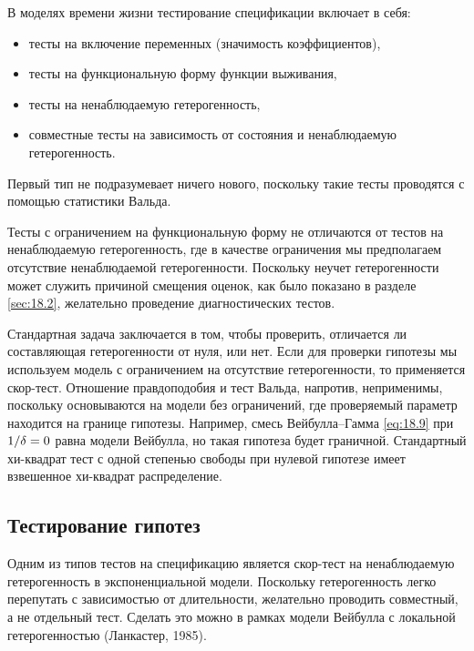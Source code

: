 \noindent
В моделях времени жизни тестирование спецификации включает в себя:
\begin{itemize}
\item тесты на включение переменных (значимость коэффициентов),\\
\item тесты на функциональную форму функции выживания,\\
\item тесты на ненаблюдаемую гетерогенность,\\
\item совместные тесты на зависимость от состояния %
и ненаблюдаемую гетерогенность.
\end{itemize}


Первый тип не подразумевает ничего нового, поскольку такие тесты проводятся с помощью статистики Вальда.

Тесты с ограничением на функциональную форму не отличаются от тестов на ненаблюдаемую гетерогенность, где в качестве ограничения мы предполагаем отсутствие ненаблюдаемой гетерогенности. Поскольку неучет гетерогенности может служить причиной смещения оценок, как было показано в разделе \ref{sec:18.2}, желательно проведение диагностических тестов.

Стандартная задача заключается в том, чтобы проверить, отличается ли составляющая гетерогенности от нуля, или нет. Если для проверки гипотезы мы используем модель с ограничением на отсутствие гетерогенности, то применяется скор-тест. Отношение правдоподобия и тест Вальда, напротив, неприменимы, поскольку основываются на модели без ограничений, где проверяемый параметр находится на границе гипотезы.
Например, смесь Вейбулла--Гамма \ref{eq:18.9} при $1/\delta = 0$ равна модели Вейбулла, но такая гипотеза будет граничной. %
Стандартный хи-квадрат тест с одной степенью свободы при нулевой гипотезе имеет взвешенное хи-квадрат распределение.


\subsection{Тестирование гипотез}\label{sec:18.7.1}

\noindent
Одним из типов тестов на спецификацию является скор-тест на ненаблюдаемую гетерогенность в экспоненциальной модели. Поскольку гетерогенность легко перепутать с зависимостью от длительности, желательно проводить совместный, а не отдельный тест. Сделать это можно в рамках модели Вейбулла с локальной гетерогенностью (Ланкастер, 1985).

